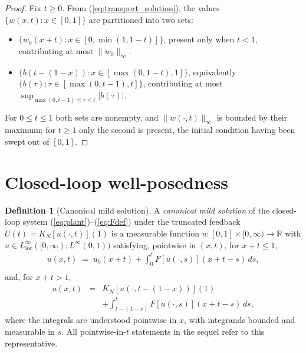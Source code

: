 \documentclass[amsthm]{autart}
\theoremstyle{plain}
\theoremstyle{definition}
\newtheorem{definition}{Definition}
\newcommand{\R}{\mathbb{R}}
\newcommand{\Linf}{L^\infty}
\begin{document}
\begin{proof}
Fix $t \ge 0$. From (\ref{eq:transport_solution}), the values $\{w(x,t) : x \in [0,1]\}$ are partitioned into two sets:
\begin{itemize}
\item $\{w_0(x+t) : x \in [0, \min(1, 1-t)]\}$, present only when $t < 1$, contributing at most $\|w_0\|_\infty$.
\item $\{b(t - (1-x)) : x \in [\max(0, 1-t), 1]\}$, equivalently $\{b(\tau) : \tau \in [\max(0, t-1), t]\}$, contributing at most $\sup_{\max(0,t-1) \le \tau \le t} |b(\tau)|$.
\end{itemize}
For $0 \le t \le 1$ both sets are nonempty, and $\|w(\cdot,t)\|_\infty$ is bounded by their maximum; for $t \ge 1$ only the second is present, the initial condition having been swept out of $[0,1]$.
\end{proof}

\section{Closed-loop well-posedness}\label{sec:wellposed}

\begin{definition}[Canonical mild solution]\label{rem:canonical_rep}
A \emph{canonical mild solution} of the closed-loop system (\ref{eq:plant})--(\ref{eq:Fdef}) under the truncated feedback $U(t) = K_N[u(\cdot, t)](1)$ is a measurable function $u: [0,1] \times [0, \infty) \to \R$ with $u \in \Linf_{\mathrm{loc}}([0, \infty); \Linf(0,1))$ satisfying, pointwise in $(x, t)$, for $x + t \le 1$,
\begin{eqnarray}
u(x, t) \;=\; u_0(x + t) + \int_0^t F[u(\cdot, s)](x + t - s)\, ds, \nonumber \\
\label{eq:canonical_mild_a}
\end{eqnarray}
and, for $x + t > 1$,
\begin{eqnarray}
u(x, t) &=& K_N[u(\cdot, t - (1-x))](1) \nonumber \\
&& + \int_{t - (1-x)}^t F[u(\cdot, s)](x + t - s)\, ds,
\label{eq:canonical_mild_b}
\end{eqnarray}
where the integrals are understood pointwise in $x$, with integrands bounded and measurable in $s$. All pointwise-in-$t$ statements in the sequel refer to this representative.
\end{definition}
\end{document}
